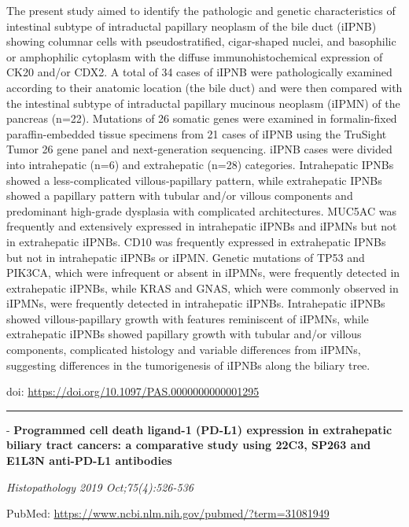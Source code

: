 \documentclass[
]{article}
\renewcommand{\linethickness}{0.05em}
\begin{document}
The present study aimed to identify the pathologic and genetic
characteristics of intestinal subtype of intraductal papillary neoplasm
of the bile duct (iIPNB) showing columnar cells with pseudostratified,
cigar-shaped nuclei, and basophilic or amphophilic cytoplasm with the
diffuse immunohistochemical expression of CK20 and/or CDX2. A total of
34 cases of iIPNB were pathologically examined according to their
anatomic location (the bile duct) and were then compared with the
intestinal subtype of intraductal papillary mucinous neoplasm (iIPMN) of
the pancreas (n=22). Mutations of 26 somatic genes were examined in
formalin-fixed paraffin-embedded tissue specimens from 21 cases of iIPNB
using the TruSight Tumor 26 gene panel and next-generation sequencing.
iIPNB cases were divided into intrahepatic (n=6) and extrahepatic (n=28)
categories. Intrahepatic IPNBs showed a less-complicated
villous-papillary pattern, while extrahepatic IPNBs showed a papillary
pattern with tubular and/or villous components and predominant
high-grade dysplasia with complicated architectures. MUC5AC was
frequently and extensively expressed in intrahepatic iIPNBs and iIPMNs
but not in extrahepatic iIPNBs. CD10 was frequently expressed in
extrahepatic IPNBs but not in intrahepatic iIPNBs or iIPMN. Genetic
mutations of TP53 and PIK3CA, which were infrequent or absent in iIPMNs,
were frequently detected in extrahepatic iIPNBs, while KRAS and GNAS,
which were commonly observed in iIPMNs, were frequently detected in
intrahepatic iIPNBs. Intrahepatic iIPNBs showed villous-papillary growth
with features reminiscent of iIPMNs, while extrahepatic iIPNBs showed
papillary growth with tubular and/or villous components, complicated
histology and variable differences from iIPMNs, suggesting differences
in the tumorigenesis of iIPNBs along the biliary tree.

doi: \url{https://doi.org/10.1097/PAS.0000000000001295}

\begin{center}\rule{0.5\linewidth}{\linethickness}\end{center}

- \textbf{Programmed cell death ligand-1 (PD-L1) expression in
extrahepatic biliary tract cancers: a comparative study using 22C3,
SP263 and E1L3N anti-PD-L1 antibodies}

\emph{Histopathology 2019 Oct;75(4):526-536}

PubMed: \url{https://www.ncbi.nlm.nih.gov/pubmed/?term=31081949}
\end{document}
